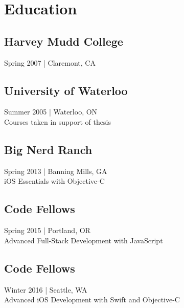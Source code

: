 \documentclass[]{jhearn-resume}
\begin{document}
\begin{minipage}[t]{0.34\textwidth} 

\vspace{25pt}
\section{Education} 

\subsection{Harvey Mudd College}
{\footnotesize Spring 2007 | Claremont, CA}
\sectionsep

\subsection{University of Waterloo}
{\small Summer 2005 | Waterloo, ON}\\
{\footnotesize Courses taken in support of thesis}
\sectionsep

\subsection{Big Nerd Ranch}
{\small Spring 2013 | Banning Mills, GA}\\
{\footnotesize iOS Essentials with Objective-C}
\sectionsep

\subsection{Code Fellows}
{\small Spring 2015 | Portland, OR}\\
{\footnotesize Advanced Full-Stack Development with JavaScript}
\sectionsep

\subsection{Code Fellows}
{\small Winter 2016 | Seattle, WA}\\
{\footnotesize Advanced iOS Development with Swift and Objective-C}
\sectionsep
\vspace{-\topsep}


\end{minipage}
\end{document}
